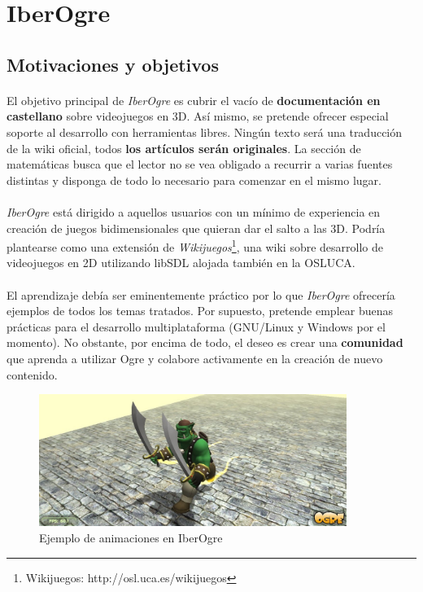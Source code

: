 \documentclass[16pt,spanish]{article}
\def \wiki{\emph{IberOgre} }
\begin{document}
\section{IberOgre}

\subsection{Motivaciones y objetivos}

\paragraph{}
El objetivo principal de \wiki es cubrir el vacío de \textbf{documentación en castellano}
sobre videojuegos en 3D. Así mismo, se pretende ofrecer especial soporte
al desarrollo con herramientas libres. Ningún texto será una traducción
de la wiki oficial, todos \textbf{los artículos serán originales}. La sección de
matemáticas busca que el lector no se vea obligado a recurrir a varias
fuentes distintas y disponga de todo lo necesario para comenzar en el
mismo lugar.

\paragraph{}
\wiki está dirigido a aquellos usuarios con un mínimo de experiencia en
creación de juegos bidimensionales que quieran dar el salto a las 3D. Podría
plantearse como una extensión de  \emph{Wikijuegos}\footnote{Wikijuegos: http://osl.uca.es/wikijuegos}, una wiki sobre
desarrollo de videojuegos en 2D utilizando libSDL alojada también en la OSLUCA.

\paragraph{}
El aprendizaje debía ser eminentemente práctico por lo que \wiki ofrecería
ejemplos de todos los temas tratados. Por supuesto, pretende emplear
buenas prácticas para el desarrollo multiplataforma (GNU/Linux y Windows
por el momento). No obstante, por encima de todo, el deseo es crear una
\textbf{comunidad} que aprenda a utilizar Ogre y colabore activamente en la creación de nuevo
contenido.

\begin{figure}[H]
    \centering
        \includegraphics[width=10cm]{img/animaciones-iberogre.jpg} 
    \caption{Ejemplo de animaciones en IberOgre}
    \label{img:animaciones-iberogre}
\end{figure}
\end{document}
